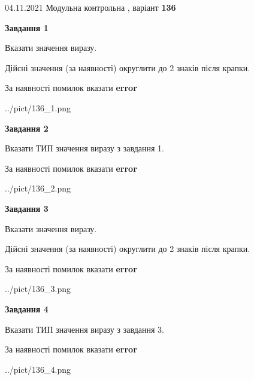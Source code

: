 \documentclass[11pt, ukrainian]{article}
\begin{document}
{04.11.2021 Модульна контрольна , варіант  \No \textbf { 136 }\par}
{
\begin {large}
{\begin {center}\textbf{Завдання 1}\end {center}}\par
Вказати значення виразу. \par
Дійсні значення (за наявності) округлити до 2 знаків після крапки. \par
За наявності помилок вказати \textbf{error}

\begin{center}
	{../pict/136_1.png}
\end{center}
\newpage

{\begin {center}\textbf{Завдання 2}\end {center}}\par
Вказати ТИП значення виразу з завдання 1. \par
За наявності помилок вказати \textbf{error}

\begin{center}
	{../pict/136_2.png}
\end{center}
\newpage

{\begin {center}\textbf{Завдання 3}\end {center}}\par
Вказати значення виразу. \par
Дійсні значення (за наявності) округлити до 2 знаків після крапки. \par
За наявності помилок вказати \textbf{error}

\begin{center}
	{../pict/136_3.png}
\end{center}
\newpage

{\begin {center}\textbf{Завдання 4}\end {center}}\par
Вказати ТИП значення виразу з завдання 3. \par
За наявності помилок вказати \textbf{error}

\begin{center}
	{../pict/136_4.png}
\end{center}
\newpage


\end{large}}
\end{document}
